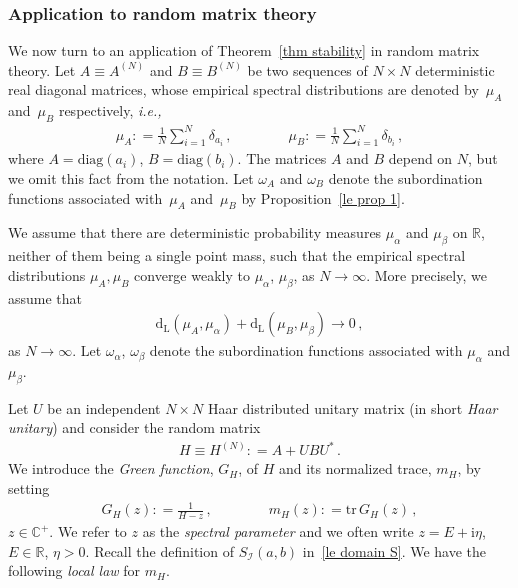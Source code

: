\documentclass[10pt,reqno]{amsart}
\numberwithin{equation}{section}
\theoremstyle{plain}
\numberwithin{kevin}{section}
\theoremstyle{remark}
\newcommand{\R}{{\mathbb R }}
\newcommand{\C}{{\mathbb C}}
\newcommand{\ii}{\mathrm{i}}
\newcommand{\deq}{\mathrel{\mathop:}=}
\newcommand{\ntr}{\mathrm{tr}\,}
\newcommand{\ie}{\emph{i.e., }}
\newcommand{\dL}{\mathrm{d}_{\mathrm{L}}}
\begin{document}
\subsubsection{Application to random matrix theory}\label{Application to random matrix theory}
We now turn to an application of Theorem~\ref{thm stability} in random matrix theory. Let $A\equiv A^{(N)}$ and $B\equiv B^{(N)}$ be two sequences of $N\times N$ deterministic real diagonal matrices, whose empirical spectral distributions are denoted by~$\mu_A$ and~$\mu_B$ respectively, \ie
\begin{align}\label{le empirical measures of A and B}
 \mu_{A}\deq\frac{1}{N}\sum_{i=1}^N\delta_{a_i}\,,\qquad\qquad\mu_{B}\deq\frac{1}{N}\sum_{i=1}^N\delta_{b_i}\,,
\end{align}
where $A=\mathrm{diag}(a_i)$, $B=\mathrm{diag}(b_i)$. The matrices $A$ and $B$ depend on $N$, but we omit this fact from the notation. Let $\omega_A$ and $\omega_B$ denote the subordination functions associated with~$\mu_A$ and~$\mu_B$ by Proposition~\ref{le prop 1}.

 We assume that there are deterministic probability measures $\mu_\alpha$ and $\mu_\beta$ on $\R$, neither of them being a single point mass, such that the empirical spectral distributions $
 \mu_A, \mu_B$ converge weakly to $\mu_\alpha$, $ \mu_\beta$, as $N\to \infty$. More precisely, we assume that 
\begin{align}\label{le assumptions convergence empirical measures}
\dL(\mu_A,\mu_\alpha)+\dL(\mu_B,\mu_\beta)\to 0\,,
\end{align}
as $N\to\infty$. Let $\omega_\alpha$, $\omega_\beta$ denote the subordination functions associated with  $\mu_\alpha$ and $\mu_\beta$.

Let $U$ be an independent $N\times N$ Haar distributed unitary matrix (in short {\it Haar unitary}) and consider the random matrix
\begin{eqnarray}\label{le our H}
H\equiv H^{(N)}\deq A+UBU^*\,.
\end{eqnarray}
We introduce the {\it Green function}, $G_H$, of $H$ and its normalized trace, $m_H$, by setting
\begin{align}\label{le true green function}
 G_H(z)\deq \frac{1}{H-z}\,,\qquad\qquad m_H(z)\deq\ntr G_H(z)\,,
\end{align}
$z\in\C^+$. We refer to $z$ as the {\it spectral parameter} and we often write $z=E+\ii\eta$, $E\in\R$, $\eta> 0$. Recall the definition of $S_{\mathcal{I}}(a,b)$ in~\eqref{le domain S}. We have the following {\it local law} for $m_H$.
\end{document}
